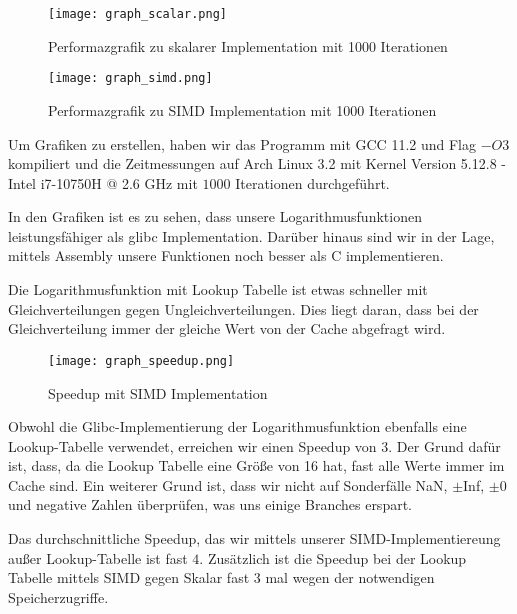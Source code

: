 \begin{figure}[h]
    \centering
    \texttt{[image: graph\_scalar.png]}
    \caption{Performazgrafik zu skalarer Implementation mit 1000 Iterationen}
    \label{fig:graph_scalar}
\end{figure}

\begin{figure}[h]
    \centering
    \texttt{[image: graph\_simd.png]}
    \caption{Performazgrafik zu SIMD Implementation mit 1000 Iterationen}
    \label{fig:graph_simd}
\end{figure}

Um Grafiken zu erstellen, haben wir das Programm mit GCC 11.2 und Flag $-O3$ kompiliert und die Zeitmessungen auf Arch Linux 3.2 mit Kernel Version 5.12.8 - Intel i7-10750H @ 2.6 GHz mit $1000$ Iterationen durchgeführt.

In den Grafiken ist es zu sehen, dass unsere Logarithmusfunktionen leistungsfähiger als glibc Implementation. Darüber hinaus sind wir in der Lage, mittels Assembly unsere Funktionen noch besser als C implementieren.

Die Logarithmusfunktion mit Lookup Tabelle ist etwas schneller mit Gleichverteilungen gegen Ungleichverteilungen. Dies liegt daran, dass bei der Gleichverteilung immer der gleiche Wert von der Cache abgefragt wird.

\begin{figure}[h]
    \centering
    \texttt{[image: graph\_speedup.png]}
    \caption{Speedup mit SIMD Implementation}
    \label{fig:graph_speedup}
\end{figure}

Obwohl die Glibc-Implementierung der Logarithmusfunktion ebenfalls eine Lookup-Tabelle verwendet, erreichen wir einen Speedup von $3$. Der Grund dafür ist, dass, da die Lookup Tabelle eine Größe von 16 hat, fast alle Werte immer im Cache sind. Ein weiterer Grund ist, dass wir nicht auf Sonderfälle  NaN, $\pm$Inf, $\pm$0 und negative Zahlen überprüfen, was uns einige Branches erspart.

Das durchschnittliche Speedup, das wir mittels unserer SIMD-Implementiereung außer Lookup-Tabelle ist fast $4$. Zusätzlich ist die Speedup bei der Lookup Tabelle mittels SIMD gegen Skalar fast 3 mal wegen der notwendigen Speicherzugriffe.